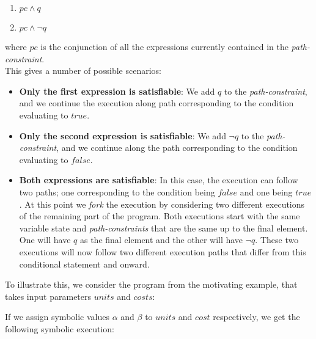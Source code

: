 		\begin{enumerate}
			\item $ pc \land q$
			\item $ pc \land \neg q$
		\end{enumerate}	
		where $pc$ is the conjunction of all the expressions currently contained in the \emph{path-constraint}.
		\\
		This gives a number of possible scenarios:	
		\begin{itemize}
			\item \textbf{Only the first expression is satisfiable}: 
			We add $q$ to the \emph{path-constraint}, and we continue the execution along path corresponding to the condition evaluating to $true$.
			\item \textbf{Only the second expression is satisfiable}:
			We add $\neg q$ to the \emph{path-constraint}, and we continue along the path corresponding to the condition evaluating to $false$. 
			\item \textbf{Both expressions are satisfiable}: In this case, the execution can follow two paths; one corresponding to the condition being $false$ and one being $true$. At this point we \emph{fork} the execution by considering two different executions of the remaining part of the program. Both executions start with the same variable state and \emph{path-constraints} that are the same
			 up to the final element. One will have $q$ as the final element and the other will have $\neg q$. 
			These two executions will now follow two different execution paths that differ from this conditional statement and onward.
		\end{itemize}
		
		To illustrate this, we consider the program from the motivating example, that takes input parameters $units$ and $costs$:
		
		\motexample{}
		
		If we assign symbolic values $\alpha$ and $\beta$ to $units$ and $cost$ respectively, we get the following symbolic execution:
		
